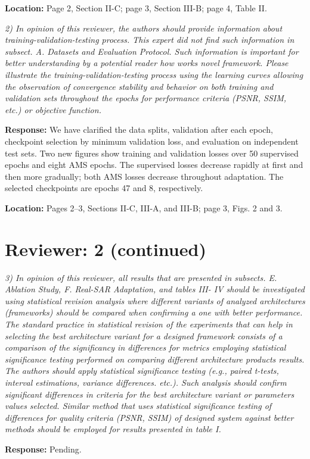 \documentclass[11pt,letterpaper]{article}
\newcommand{\pendingnumberedcomment}[2]{%
  \Needspace{5\baselineskip}%
  \textit{#1 #2}\par
  {\small\textbf{Response:} Pending.}\par
  \vspace{6pt}%
}
\begin{document}
\textbf{Location:} Page 2, Section II-C; page 3, Section III-B; page 4, Table II.

\textit{2) In opinion of this reviewer, the authors should provide information about training-validation-testing process. This expert did not find such information in subsect. A. Datasets and Evaluation Protocol. Such information is important for better understanding by a potential reader how works novel framework. Please illustrate the training-validation-testing process using the learning curves allowing the observation of convergence stability and behavior on both training and validation sets throughout the epochs for performance criteria (PSNR, SSIM, etc.) or objective function.}

\textbf{Response:} We have clarified the data splits, validation after each epoch, checkpoint selection by minimum validation loss, and evaluation on independent test sets. Two new figures show training and validation losses over 50 supervised epochs and eight AMS epochs. The supervised losses decrease rapidly at first and then more gradually; both AMS losses decrease throughout adaptation. The selected checkpoints are epochs 47 and 8, respectively.

\textbf{Location:} Pages 2--3, Sections II-C, III-A, and III-B; page 3, Figs. 2 and 3.

\clearpage
\section*{Reviewer: 2 (continued)}
\pendingnumberedcomment{3)}{In opinion of this reviewer, all results that are presented in subsects. E. Ablation Study, F. Real-SAR Adaptation, and tables III- IV should be investigated using statistical revision analysis where different variants of analyzed architectures (frameworks) should be compared when confirming a one with better performance. The standard practice in statistical revision of the experiments that can help in selecting the best architecture variant for a designed framework consists of a comparison of the significancy in differences for metrics employing statistical significance testing performed on comparing different architecture products\textasciiacute{} results. The authors should apply statistical significance testing (e.g., paired t-tests, interval estimations, variance differences. etc.). Such analysis should confirm significant differences in criteria for the best architecture variant or parameters\textasciiacute{} values selected. Similar method that uses statistical significance testing of differences for quality criteria (PSNR, SSIM) of designed system against better methods should be employed for results presented in table I.}
\end{document}
